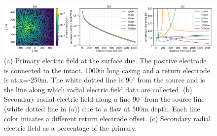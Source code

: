 \begin{figure}
    \begin{center}
    \includegraphics[width=\textwidth]{figures/integrity_survey_design.png}
    \end{center}
\caption{
    (a) Primary electric field at the surface due.
    The positive electrode is connected to the intact,
    1000m long casing and a return electrode is at x=-250m. The white dotted
    line is $90^\circ$ from the source and is the line along which radial electric field
    data are collected.
    (b) Secondary radial electric field along a line $90^{\circ}$ from the source line (white dotted line in (a))
    due to a flaw at 500m depth. Each line color inicates a different return electrode offset.
    (c) Secondary radial electric field as a percentage of the primary.
}
\label{fig:integrity_survey_design}
\end{figure}
